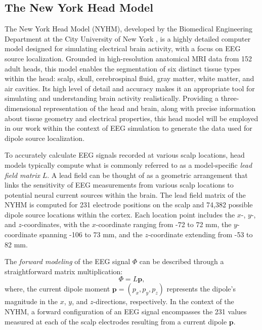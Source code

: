 \documentclass[a4paper, UKenglish, 11pt]{uiomaster}
\begin{document}
\subsection{The New York Head Model}
The New York Head Model (NYHM), developed by the Biomedical Engineering Department at the City University of New York \cite{huang2016new}, is a highly detailed computer model designed for simulating electrical brain activity, with a focus on EEG source localization. Grounded in high-resolution anatomical MRI data from 152 adult heads, this model enables the segmentation of six distinct tissue types within the head: scalp, skull, cerebrospinal fluid, gray matter, white matter, and air cavities. Its high level of detail and accuracy makes it an appropriate tool for simulating and understanding brain activity realistically. Providing a three-dimensional representation of the head and brain, along with precise information about tissue geometry and electrical properties, this head model will be employed in our work within the context of EEG simulation to generate the data used for dipole source localization.

To accurately calculate EEG signals recorded at various scalp locations, head models typically compute what is commonly referred to as a model-specific \emph{lead field matrix} \(L\). A lead field can be thought of as a geometric arrangement that links the sensitivity of EEG measurements from various scalp locations to potential neural current sources within the brain. The lead field matrix of the NYHM is computed for 231 electrode positions on the scalp and 74,382 possible dipole source locations within the cortex. Each location point includes the \(x\)-, \(y\)-, and \(z\)-coordinates, with the \(x\)-coordinate ranging from -72 to 72 mm, the \(y\)-coordinate spanning -106 to 73 mm, and the \(z\)-coordinate extending from -53 to 82 mm.

The \emph{forward modeling} of the EEG signal \(\Phi\) can be described through a straightforward matrix multiplication:
\begin{equation}
  \Phi = L \mathbf{p},
  \label{eq:EEG_signal_matrix}
\end{equation}
where, the current dipole moment \(\mathbf{p} = (p_x, p_y, p_z)\) represents the dipole's magnitude in the \(x\), \(y\), and \(z\)-directions, respectively. In the context of the NYHM, a forward configuration of an EEG signal encompasses the 231 values measured at each of the scalp electrodes resulting from a current dipole \(\mathbf{p}\).
\end{document}
